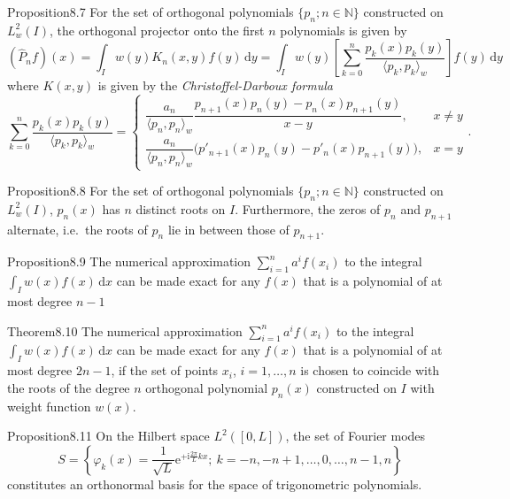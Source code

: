\begin{res}{Proposition}{8.7}
For the set of orthogonal polynomials $\{p_n;n\in\mathbb N\}$ constructed on $L^2_w(I)$, the orthogonal projector onto the first $n$ polynomials is given by
\begin{equation}(\hat P_nf)(x)=\int_Iw(y)K_n(x,y)f(y)\,\mathrm dy=\int_Iw(y)\left[\sum_{k=0}^n\frac{p_k(x)p_k(y)}{\langle p_k,p_k\rangle_w}\right]f(y)\,\mathrm dy\tag{8.16}\end{equation}
where $K(x,y)$ is given by the \textit{Christoffel-Darboux formula}
\begin{equation}\sum_{k=0}^n\frac{p_k(x)p_k(y)}{\langle p_k,p_k\rangle_w}=\begin{cases}\dfrac{a_n}{\langle p_n,p_n\rangle_w}\dfrac{p_{n+1}(x)p_n(y)-p_n(x)p_{n+1}(y)}{x-y},&x\ne y\\[8pt]\dfrac{a_n}{\langle p_n,p_n\rangle_w}\bigl(p'_{n+1}(x)p_n(y)-p'_n(x)p_{n+1}(y)\bigr),&x=y\end{cases}.\tag{8.17}\end{equation}
\end{res}

\begin{res}{Proposition}{8.8}
For the set of orthogonal polynomials $\{p_n;n\in\mathbb N\}$ constructed on $L^2_w(I)$, $p_n(x)$ has $n$ distinct roots on $I$. Furthermore, the zeros of $p_n$ and $p_{n+1}$ alternate, i.e.\ the roots of $p_n$ lie in between those of $p_{n+1}$.
\end{res}

\begin{res}{Proposition}{8.9}
The numerical approximation $\sum_{i=1}^na^if(x_i)$ to the integral $\int_Iw(x)f(x)\,\mathrm dx$ can be made exact for any $f(x)$ that is a polynomial of at most degree $n-1$
\end{res}

\begin{res}{Theorem}{8.10}
The numerical approximation $\sum_{i=1}^na^if(x_i)$ to the integral $\int_Iw(x)f(x)\,\mathrm dx$ can be made exact for any $f(x)$ that is a polynomial of at most degree $2n-1$, if the set of points $x_i$, $i=1,\dots,n$ is chosen to coincide with the roots of the degree $n$ orthogonal polynomial $p_n(x)$ constructed on $I$ with weight function $w(x)$.
\end{res}

\begin{res}{Proposition}{8.11}
On the Hilbert space $L^2([0,L])$, the set of Fourier modes
\begin{equation}S=\left\{\varphi_k(x)=\frac1{\sqrt L}\mathrm e^{+\mathrm i\frac{2\pi}{L}kx};\ k=-n,-n+1,\dots,0,\dots,n-1,n\right\}\tag{8.56}\end{equation}
constitutes an orthonormal basis for the space of trigonometric polynomials.
\end{res}


